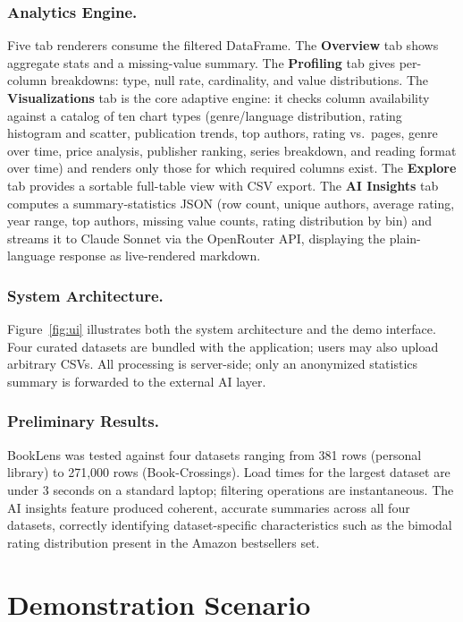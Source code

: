 \documentclass[sigconf]{acmart}
\begin{document}
\subsubsection*{Analytics Engine.} Five tab renderers consume the filtered DataFrame. The \textbf{Overview} tab shows aggregate stats and a missing-value summary. The \textbf{Profiling} tab gives per-column breakdowns: type, null rate, cardinality, and value distributions. The \textbf{Visualizations} tab is the core adaptive engine: it checks column availability against a catalog of ten chart types (genre/language distribution, rating histogram and scatter, publication trends, top authors, rating vs.\ pages, genre over time, price analysis, publisher ranking, series breakdown, and reading format over time) and renders only those for which required columns exist. The \textbf{Explore} tab provides a sortable full-table view with CSV export. The \textbf{AI Insights} tab computes a summary-statistics JSON (row count, unique authors, average rating, year range, top authors, missing value counts, rating distribution by bin) and streams it to Claude Sonnet via the OpenRouter API, displaying the plain-language response as live-rendered markdown.

\subsubsection*{System Architecture.} Figure~\ref{fig:ui} illustrates both the system architecture and the demo interface. Four curated datasets are bundled with the application; users may also upload arbitrary CSVs. All processing is server-side; only an anonymized statistics summary is forwarded to the external AI layer.

\subsubsection*{Preliminary Results.} BookLens was tested against four datasets ranging from 381 rows (personal library) to 271,000 rows (Book-Crossings). Load times for the largest dataset are under 3 seconds on a standard laptop; filtering operations are instantaneous. The AI insights feature produced coherent, accurate summaries across all four datasets, correctly identifying dataset-specific characteristics such as the bimodal rating distribution present in the Amazon bestsellers set.

\section{Demonstration Scenario}
\label{sec:demo}
\end{document}
